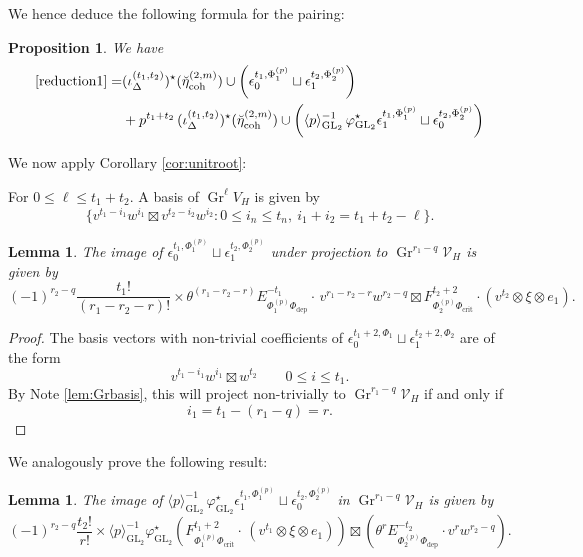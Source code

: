 \documentclass[cjm]{ipart}
\theoremstyle{plain}
\newtheorem{lemma}[theorem]{Lemma}
\newtheorem{proposition}[theorem]{Proposition}
\theoremstyle{remark}
\DeclareMathOperator{\coh}{coh}
\DeclareMathOperator{\crit}{crit}
\DeclareMathOperator{\GL}{GL}
\DeclareMathOperator{\Gr}{Gr}
\newcommand{\cV}{\mathcal{V}}
\newcommand{\dep}{\mathrm{dep}}
\numberwithin{equation}{subsection}
\renewcommand{\leq}{\leqslant}
\begin{document}
    We hence deduce the following formula for the pairing:

    \begin{proposition}\label{prop:red2}
     We have
     \begin{align*}
      \text{\eqref{reduction1}}= & (\iota^{(t_1,t_2)}_\Delta)^\star(\breve\eta^{(2,m)}_{\coh})\cup \left(\epsilon^{t_1,\Phi^{(p)}_1}_0\sqcup \epsilon^{t_2,\Phi^{(p)}_2}_1\right)\\
     & +p^{t_1+t_2}\, (\iota^{(t_1,t_2)}_\Delta)^\star(\breve\eta^{(2,m)}_{\coh})\cup  \left( \langle p\rangle_{\GL_2}^{-1}\, \varphi_{\GL_2}^\star\epsilon^{t_1,\Phi^{(p)}_1}_1\sqcup\epsilon^{t_2,\Phi^{(p)}_2}_0\right)
     \end{align*}
    \end{proposition}

    We now apply Corollary \ref{cor:unitroot}:

  \begin{note}\label{lem:Grbasis}
   For $0\leq \ell\leq t_1+t_2$. A basis of $\Gr^\ell V_H$ is given by
   \[\{ v^{t_1-i_1}w^{i_1}\boxtimes v^{t_2-i_2}w^{i_2}: 0\leq i_n\leq t_n,\ i_1+i_2=t_1+t_2-\ell\}.\]
  \end{note}

   \begin{lemma}\label{lem:EsynimageinGr1}
    The image of $\epsilon^{t_1,\Phi^{(p)}_1}_{0}\sqcup \epsilon^{t_2,\Phi^{(p)}_2}_{1}$ under projection to $\Gr^{r_1-q}\cV_H$ is given by
    \[ (-1)^{r_2-q}\frac{t_1!}{(r_1-r_2-r)!}\times \theta^{(r_1-r_2-r)}E^{-t_1}_{\Phi_1^{(p)}\Phi_{\dep}}\cdot  \,v^{r_1-r_2-r}w^{r_2-q}\boxtimes F^{t_2+2}_{\Phi^{(p)}_2\Phi_{\crit}}\cdot (v^{t_2}\otimes \xi\otimes e_1).\]
   \end{lemma}

   \begin{proof}
    The basis vectors with non-trivial coefficients of $\epsilon^{t_1+2,\Phi_1}_{0}\sqcup \epsilon^{t_2+2,\Phi_2}_{1}$ are of the form
    \[ v^{t_1-i_1}w^{i_1}\boxtimes w^{t_2}\qquad 0\leq i\leq t_1.\]
    By Note \ref{lem:Grbasis}, this will project non-trivially to $\Gr^{r_1-q}\cV_H$ if and only if
    \[i_1=t_1-(r_1-q)=r.\]
   \end{proof}

   We analogously prove the following result:

   \begin{lemma}
    \label{lem:EsynimageinGr2}
    The image of $\langle p\rangle_{\GL_2}^{-1}\, \varphi_{\GL_2}^\star\epsilon^{t_1,\Phi^{(p)}_1}_1\sqcup \epsilon^{t_2,\Phi^{(p)}_2}_0$ in $\Gr^{r_1-q}\cV_H$ is given by
    \[
     (-1)^{r_2-q}\frac{t_2!}{r!}\times \langle p\rangle_{\GL_2}^{-1}\varphi_{\GL_2}^\star\left(F^{t_1+2}_{\Phi^{(p)}_1\Phi_{\crit}}\cdot\,(v^{t_1}\otimes \xi\otimes e_1)\right)\boxtimes \left(\theta^{r}E^{-t_2}_{\Phi^{(p)}_2\Phi_{\dep}}\cdot v^rw^{r_2-q}\right).
    \]
   \end{lemma}
\end{document}
